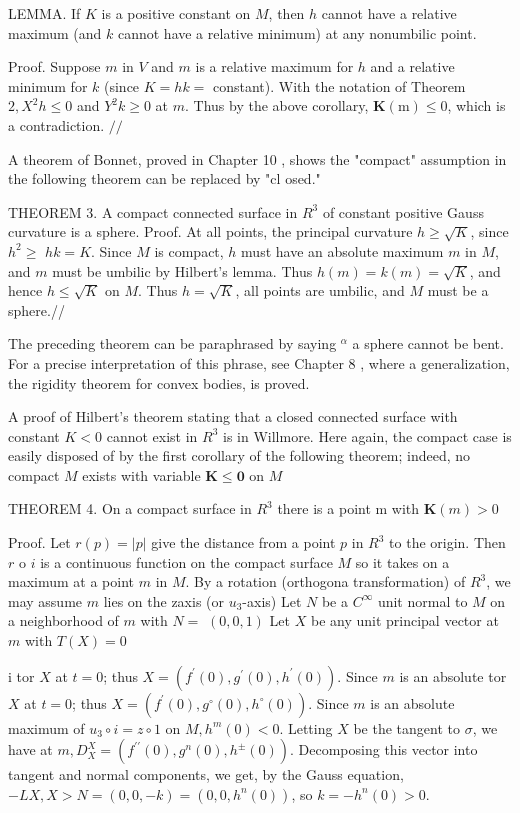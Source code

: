 \documentclass[10pt]{article}
\begin{document}
LEMMA. If $K$ is a positive constant on $M$, then $h$ cannot have a relative maximum (and $k$ cannot have a relative minimum) at any nonumbilic point.

Proof. Suppose $m$ in $V$ and $m$ is a relative maximum for $h$ and a relative minimum for $k$ (since $K=h k=$ constant). With the notation of Theorem $2, X^{2} h \leq 0$ and $Y^{2} k \geq 0$ at $m$. Thus by the above corollary, $\boldsymbol{K}(\mathrm{m}) \leq 0$, which is a contradiction. $/ /$

A theorem of Bonnet, proved in Chapter 10 , shows the "compact" assumption in the following theorem can be replaced by "cl osed."

THEOREM 3. A compact connected surface in $R^{3}$ of constant positive Gauss curvature is a sphere. Proof. At all points, the principal curvature $h \geq \sqrt{K}$, since $h^{2} \geq$ $h k=K .$ Since $M$ is compact, $h$ must have an absolute maximum $m$ in $M$, and $m$ must be umbilic by Hilbert's lemma. Thus $h(m)=k(m)=\sqrt{K}$, and hence $h \leq \sqrt{K}$ on $M$. Thus $h=\sqrt{K}$, all points are umbilic, and $M$ must be a sphere.//

The preceding theorem can be paraphrased by saying ${ }^{\alpha}$ a sphere cannot be bent. For a precise interpretation of this phrase, see Chapter 8 , where a generalization, the rigidity theorem for convex bodies, is proved.

A proof of Hilbert's theorem stating that a closed connected surface with constant $K<0$ cannot exist in $R^{3}$ is in Willmore. Here again, the compact case is easily disposed of by the first corollary of the following theorem; indeed, no compact $M$ exists with variable $\boldsymbol{K} \leq \mathbf{0}$ on $M$

THEOREM 4. On a compact surface in $R^{3}$ there is a point m with $\boldsymbol{K}(m)>0$

Proof. Let $r(p)=|p|$ give the distance from a point $p$ in $R^{3}$ to the origin. Then $r$ o $i$ is a continuous function on the compact surface $M$ so it takes on a maximum at a point $m$ in $M$. By a rotation (orthogona transformation) of $R^{3}$, we may assume $m$ lies on the zaxis (or $u_{3}$-axis) Let $N$ be a $C^{\infty}$ unit normal to $M$ on a neighborhood of $m$ with $N=$ $(0,0,1)$ Let $X$ be any unit principal vector at $m$ with $T(X)=0$

i tor $X$ at $t=0$; thus $X=\left(f^{\prime}(0), g^{\prime}(0), h^{\prime}(0)\right)$. Since $m$ is an absolute tor $X$ at $t=0$; thus $X=\left(f^{\prime}(0), g^{\circ}(0), h^{\circ}(0)\right)$. Since $m$ is an absolute maximum of $u_{3} \circ i=z \circ 1$ on $M, h^{m}(0)<0$. Letting $X$ be the tangent to $\sigma$, we have at $m, D_{X}^{X}=\left(f^{\prime \prime}(0), g^{n}(0), h^{\pm}(0)\right) .$ Decomposing this vector into tangent and normal components, we get, by the Gauss equation, $-L X, X>N=(0,0,-k)=\left(0,0, h^{n}(0)\right)$, so $k=-h^{n}(0)>0$.
\end{document}
